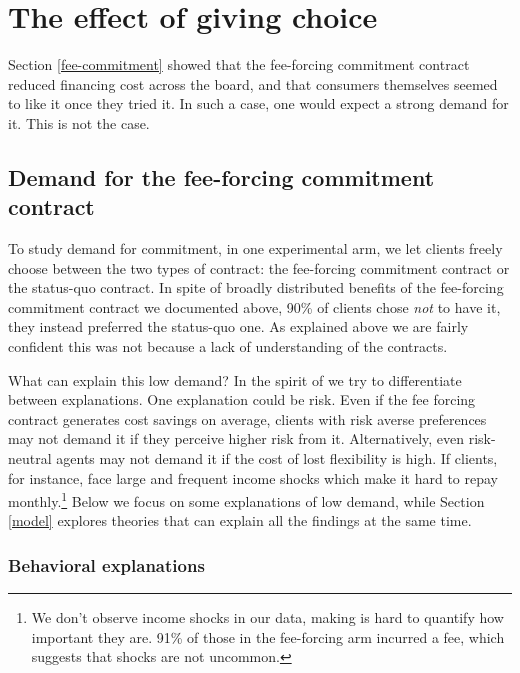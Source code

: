 \documentclass[oneside,11pt]{article}
\begin{document}
\section{The effect of giving choice} \label{fee-choice}

Section \ref{fee-commitment} showed that the fee-forcing commitment contract reduced financing cost across the board, and that consumers themselves seemed to like it once they tried it. In such a case, one would expect a strong demand for it. This is not the case.

\subsection{Demand for the fee-forcing commitment contract} \label{sec:demand}

To study demand for commitment, in one experimental arm, we let clients freely choose between the two types of contract: the fee-forcing commitment contract or the status-quo contract. In spite of broadly distributed benefits of the fee-forcing commitment contract we documented above, 90\% of clients chose \textit{not} to have it, they instead preferred the status-quo one. As explained above we are fairly confident this was not because a lack of understanding of the contracts. 

What can explain this low demand? In the spirit of \cite{Blumenstock} we try to differentiate between explanations. One explanation could be risk. Even if the fee forcing contract generates cost savings on average, clients with risk averse preferences may not demand it if they perceive higher risk from it.  Alternatively, even risk-neutral agents may not demand it if the cost of lost flexibility is high. If clients, for instance, face large and frequent income shocks which make it hard to repay monthly.\footnote{We don't observe income shocks in our data, making is hard to quantify how important they are. 91\% of those in the fee-forcing arm incurred a fee, which suggests that shocks are not uncommon.} Below we focus on some explanations of low demand, while Section \ref{model} explores theories that can explain all the findings at the same time.


\subsubsection{Behavioral explanations} \label{behavioral}
\end{document}
